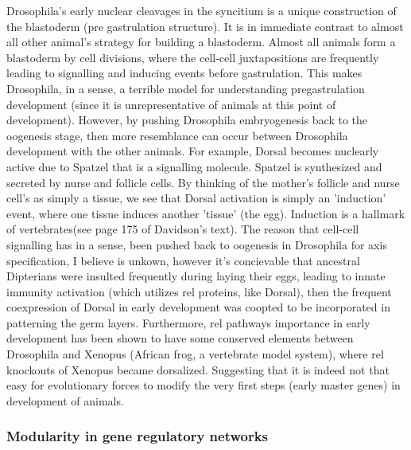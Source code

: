   Drosophila's early nuclear cleavages in the syncitium is a unique construction of the blastoderm (pre gastrulation structure).  It is in immediate contrast to almost all other animal's strategy for building a blastoderm.  Almost all animals form a blastoderm by cell divisions, where the cell-cell juxtapositions are frequently leading to signalling and inducing events before gastrulation.  This makes Drosophila, in a sense, a terrible model for understanding pregastrulation development (since it is unrepresentative of animals at this point of development).  However, by pushing Drosophila embryogenesis back to the oogenesis stage, then more resemblance can occur between Drosophila development with the other animals.  For example, Dorsal becomes nuclearly active due to Spatzel that is a signalling molecule.  Spatzel is synthesized and secreted by nurse and follicle cells.  By thinking of the mother's follicle and nurse cell's as simply a tissue, we see that Dorsal activation is simply an 'induction' event, where one tissue induces another 'tissue' (the egg).  Induction is a hallmark of vertebrates(see page 175 of Davidson's text\cite{Davidson2006}).  The reason that cell-cell signalling has in a sense, been pushed back to oogenesis in Drosophila for axis specification, I believe is unkown, however it's concievable that ancestral Dipterians were insulted frequently during laying their eggs, leading to innate immunity activation (which utilizes rel proteins, like Dorsal), then the frequent coexpression of Dorsal in early development was coopted to be incorporated in patterning the germ layers.  Furthermore, rel pathways importance in early development has been shown to have some conserved elements between Drosophila and Xenopus (African frog, a vertebrate model system), where rel knockouts of Xenopus became dorsalized\cite{pmid9507077}.  Suggesting that it is indeed not that easy for evolutionary forces to modify the very first steps (early master genes) in development of animals.    

\subsubsection{Modularity in gene regulatory networks}

